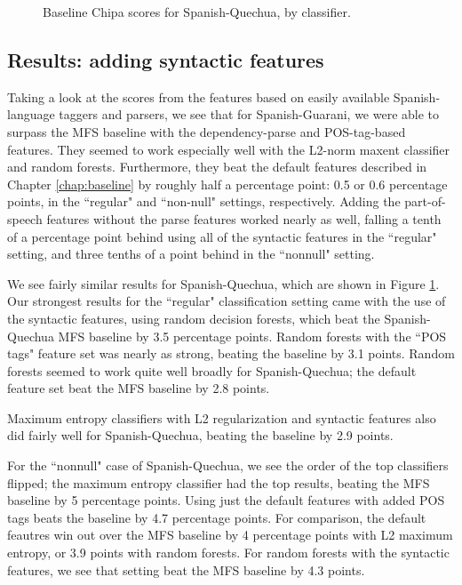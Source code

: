 \begin{figure}
  \caption{Baseline Chipa scores for Spanish-Quechua, by classifier.}
  \label{fig:esquresults:monolingual}
\end{figure}

\subsection{Results: adding syntactic features}
Taking a look at the scores from the features based on easily available
Spanish-language taggers and parsers, we see that for Spanish-Guarani, we were
able to surpass the MFS baseline with the dependency-parse and POS-tag-based
features. They seemed to work especially well with the L2-norm maxent
classifier and random forests.  Furthermore, they beat the default features
described in Chapter \ref{chap:baseline} by roughly half a percentage point:
0.5 or 0.6 percentage points, in the ``regular" and ``non-null" settings,
respectively. Adding the part-of-speech features without the parse features
worked nearly as well, falling a tenth of a percentage point behind using all
of the syntactic features in the ``regular" setting, and three tenths of a
point behind in the ``nonnull" setting.

We see fairly similar results for Spanish-Quechua, which are shown in Figure
\ref{fig:esquresults:monolingual}. Our strongest results for the ``regular"
classification setting came with the use of the syntactic features, using
random decision forests, which beat the Spanish-Quechua MFS baseline by 3.5
percentage points. Random forests with the ``POS tags" feature set was nearly
as strong, beating the baseline by 3.1 points. Random forests seemed to work
quite well broadly for Spanish-Quechua; the default feature set beat the
MFS baseline by 2.8 points.

Maximum entropy classifiers with L2 regularization and syntactic features also
did fairly well for Spanish-Quechua, beating the baseline by 2.9 points.

For the ``nonnull" case of Spanish-Quechua, we see the order of the top
classifiers flipped; the maximum entropy classifier had the top results,
beating the MFS baseline by 5 percentage points. Using just the default
features with added POS tags beats the baseline by 4.7 percentage points. For
comparison, the default feautres win out over the MFS baseline by 4 percentage
points with L2 maximum entropy, or 3.9 points with random forests. For random
forests with the syntactic features, we see that setting beat the MFS baseline
by 4.3 points.

